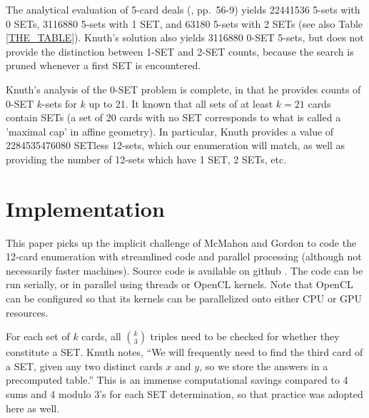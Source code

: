 \documentclass[10pt]{amsart}
\begin{document}
The analytical evaluation of 5-card deals (\cite{JOS}, pp.~56-9) yields 22441536
5-sets with 0 SETs, 3116880 5-sets with 1 SET, and 63180 5-sets with 2 SETs (see
also Table \ref{THE_TABLE}). Knuth's solution also yields 3116880 0-SET 5-sets,
but does not provide the distinction between 1-SET and 2-SET counts, because the
search is pruned whenever a first SET is encountered.

Knuth's analysis of the 0-SET problem is complete, in that he provides counts of
0-SET $k$-sets for $k$ up to 21. It known \cite{MAXCAP} that all sets of at
least $k=21$ cards contain SETs (a set of 20 cards with no SET corresponds to
what is called a 'maximal cap' in affine geometry). In particular, Knuth
provides a value of 2284535476080 SETless 12-sets, which our enumeration will
match, as well as providing the number of 12-sets which have 1 SET, 2 SETs, etc.


\section{Implementation}
This paper picks up the implicit challenge of McMahon and Gordon to code the
12-card enumeration with streamlined code and parallel processing (although not
necessarily faster machines). Source code is available on github \cite{ME}. The
code can be run serially, or in parallel using threads or OpenCL \cite{OPENCL}
kernels. Note that OpenCL can be configured so that its kernels can be
parallelized onto either CPU or GPU resources.

For each set of $k$ cards, all $\binom{k}{3}$ triples need to be checked for
whether they constitute a SET. Knuth notes, ``We will frequently need to find
the third card of a SET, given any two distinct cards $x$ and $y$, so we store
the answers in a precomputed table.''  This is an immense computational savings
compared to 4 sums and 4 modulo 3's for each SET determination, so that practice
was adopted here as well.
\end{document}
